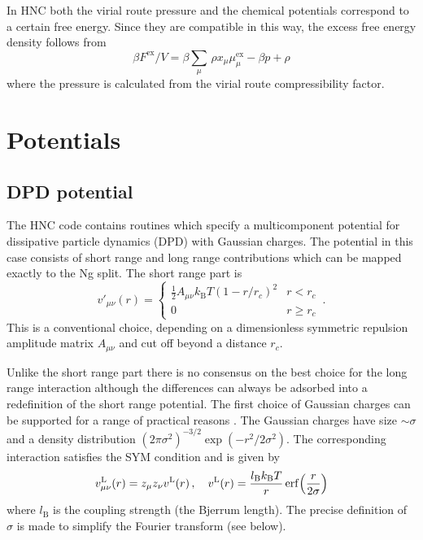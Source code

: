 \documentclass[12pt,a4paper]{article}
\DeclareMathOperator{\erf}{erf}
\newcommand{\kB}{k_{\mathrm{B}}}
\newcommand{\kT}{\kB T}
\newcommand{\myex}{^{\mathrm{ex}}}
\newcommand{\Fex}{F\myex}
\newcommand{\muex}{\mu\myex}
\newcommand{\lr}{^{\mathrm{L}}}
\begin{document}
In HNC both the virial route pressure and the chemical potentials
correspond to a certain free energy.  Since they are compatible in
this way, the excess free energy density follows from
%
\begin{equation}
{\beta\Fex}/{V} = \beta{\textstyle \sum_{\mu}}\,\rho x_\mu \muex_\mu
-\beta p + \rho
\end{equation}
%
where the pressure is calculated from the virial route compressibility
factor.

\section{Potentials}
%
\subsection{DPD potential}
\label{sec:dpd}
%
The HNC code contains routines which specify a multicomponent
potential for dissipative particle dynamics (DPD) with Gaussian
charges.  The potential in this case consists of short range and long
range contributions which can be mapped exactly to the Ng split.  The
short range part is
%
\newcommand{\rc}{r_c}
\newcommand{\lB}{l_{\mathrm{B}}}
\begin{equation}
v'_{\mu\nu}(r)=\left\{\begin{array}{ll}
\frac{1}{2}A_{\mu\nu}\kT(1-r/\rc)^2 & r<\rc\\[3pt]
0 & r \ge \rc
\end{array}\right.\,.
\end{equation}
%
This is a conventional choice, depending on a dimensionless symmetric
repulsion amplitude matrix $A_{\mu\nu}$ and cut off beyond a
distance $\rc$.  

Unlike the short range part there is no consensus on the best choice
for the long range interaction although the differences can always be
adsorbed into a redefinition of the short range potential.  The first
choice of Gaussian charges can be supported for a range of practical
reasons \cite{WVA+13, WV14}.  The Gaussian charges have size
$\sim\sigma$ and a density distribution $(2\pi\sigma^2)^{-3/2}
\exp({-r^2/2\sigma^2})$.  The corresponding interaction satisfies the
SYM condition and is given by
%
\begin{equation}
v_{\mu\nu}\lr(r)=z_\mu z_\nu v\lr(r)\,,\quad
v\lr(r)=\frac{\lB\kT}{r}
\erf\Bigl(\frac{r}{2\sigma}\Bigr)
\label{eq:dpdvlr}
\end{equation}
%
where $\lB$ is the coupling strength (the Bjerrum length).  The
precise definition of $\sigma$ is made to simplify the Fourier
transform (see below).
\end{document}
